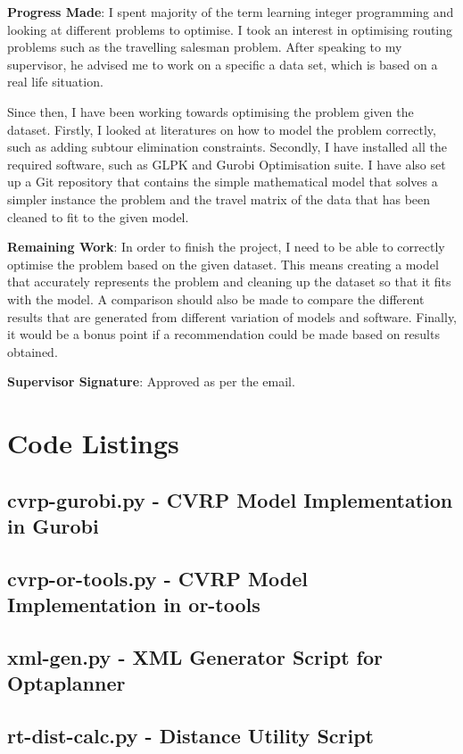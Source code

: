 \textbf{Progress Made}: I spent majority of the term learning integer programming and looking at different problems to optimise.
I took an interest in optimising routing problems such as the travelling salesman problem. After speaking to my supervisor,
 he advised me to work on a specific a data set, which is based on a real life situation.

Since then, I have been working towards optimising the problem given the dataset. Firstly, I looked at literatures on
how to model the problem correctly, such as adding subtour elimination constraints. Secondly, I have installed all the
required software, such as GLPK and Gurobi Optimisation suite. I have also set up a Git repository that contains the
simple mathematical model that solves a simpler instance the problem and the travel matrix of the data that has been
cleaned to fit to the given model.

\textbf{Remaining Work}: In order to finish the project, I need to be able to correctly optimise the problem based on the given
dataset. This means creating a model that accurately represents the problem and cleaning up the dataset so that it fits
with the model. A comparison should also be made to compare the different results that are generated from different
variation of models and software. Finally, it would be a bonus point if a recommendation could be made based on
results obtained.

\textbf{Supervisor Signature}:  Approved as per the email.


\chapter{Code Listings}

\section{cvrp-gurobi.py - CVRP Model Implementation in Gurobi}


\section{cvrp-or-tools.py - CVRP Model Implementation in or-tools}


\section{xml-gen.py - XML Generator Script for Optaplanner}


\section{rt-dist-calc.py - Distance Utility Script}

